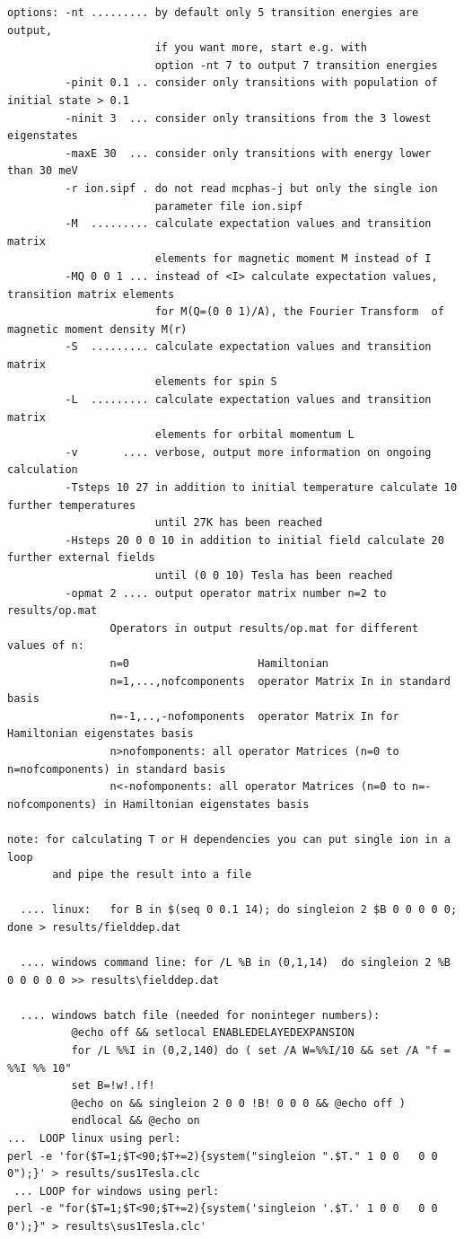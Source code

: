 \begin{description}
\begin{verbatim}
options: -nt ......... by default only 5 transition energies are output,
                       if you want more, start e.g. with 
                       option -nt 7 to output 7 transition energies
         -pinit 0.1 .. consider only transitions with population of initial state > 0.1
         -ninit 3  ... consider only transitions from the 3 lowest eigenstates
         -maxE 30  ... consider only transitions with energy lower than 30 meV
         -r ion.sipf . do not read mcphas-j but only the single ion
                       parameter file ion.sipf
         -M  ......... calculate expectation values and transition matrix
                       elements for magnetic moment M instead of I
         -MQ 0 0 1 ... instead of <I> calculate expectation values, transition matrix elements
                       for M(Q=(0 0 1)/A), the Fourier Transform  of magnetic moment density M(r)
         -S  ......... calculate expectation values and transition matrix
                       elements for spin S
         -L  ......... calculate expectation values and transition matrix
                       elements for orbital momentum L
         -v       .... verbose, output more information on ongoing calculation
         -Tsteps 10 27 in addition to initial temperature calculate 10 further temperatures
                       until 27K has been reached
         -Hsteps 20 0 0 10 in addition to initial field calculate 20 further external fields
                       until (0 0 10) Tesla has been reached
         -opmat 2 .... output operator matrix number n=2 to results/op.mat
                Operators in output results/op.mat for different values of n:
                n=0                    Hamiltonian
                n=1,...,nofcomponents  operator Matrix In in standard basis
                n=-1,..,-nofomponents  operator Matrix In for Hamiltonian eigenstates basis
                n>nofomponents: all operator Matrices (n=0 to n=nofcomponents) in standard basis
                n<-nofomponents: all operator Matrices (n=0 to n=-nofcomponents) in Hamiltonian eigenstates basis

note: for calculating T or H dependencies you can put single ion in a loop
       and pipe the result into a file

  .... linux:   for B in $(seq 0 0.1 14); do singleion 2 $B 0 0 0 0 0; done > results/fielddep.dat

  .... windows command line: for /L %B in (0,1,14)  do singleion 2 %B 0 0 0 0 0 >> results\fielddep.dat

  .... windows batch file (needed for noninteger numbers):
          @echo off && setlocal ENABLEDELAYEDEXPANSION
          for /L %%I in (0,2,140) do ( set /A W=%%I/10 && set /A "f = %%I %% 10"
          set B=!w!.!f!
          @echo on && singleion 2 0 0 !B! 0 0 0 && @echo off )
          endlocal && @echo on 
...  LOOP linux using perl:
perl -e 'for($T=1;$T<90;$T+=2){system("singleion ".$T." 1 0 0   0 0 0");}' > results/sus1Tesla.clc
 ... LOOP for windows using perl:
perl -e "for($T=1;$T<90;$T+=2){system('singleion '.$T.' 1 0 0   0 0 0');}" > results\sus1Tesla.clc'


\end{verbatim}
\end{description}
